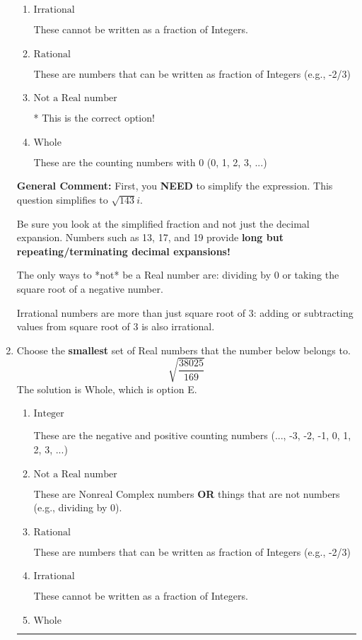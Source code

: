 \documentclass{extbook}[14pt]
\newcommand{\litem}[1]{\item #1

\rule{\textwidth}{0.4pt}}
\begin{document}
\begin{enumerate}
{\begin{enumerate}[label=\Alph*.]
These are the negative and positive counting numbers (..., -3, -2, -1, 0, 1, 2, 3, ...)
\item \( \text{Irrational} \)

These cannot be written as a fraction of Integers.
\item \( \text{Rational} \)

These are numbers that can be written as fraction of Integers (e.g., -2/3)
\item \( \text{Not a Real number} \)

* This is the correct option!
\item \( \text{Whole} \)

These are the counting numbers with 0 (0, 1, 2, 3, ...)
\end{enumerate}

\textbf{General Comment:} First, you \textbf{NEED} to simplify the expression. This question simplifies to $\sqrt{143} i$. 
 
 Be sure you look at the simplified fraction and not just the decimal expansion. Numbers such as 13, 17, and 19 provide \textbf{long but repeating/terminating decimal expansions!} 
 
 The only ways to *not* be a Real number are: dividing by 0 or taking the square root of a negative number. 
 
 Irrational numbers are more than just square root of 3: adding or subtracting values from square root of 3 is also irrational.
}
\litem{
Choose the \textbf{smallest} set of Real numbers that the number below belongs to.
\[ \sqrt{\frac{38025}{169}} \]The solution is \( \text{Whole} \), which is option E.\begin{enumerate}[label=\Alph*.]
\item \( \text{Integer} \)

These are the negative and positive counting numbers (..., -3, -2, -1, 0, 1, 2, 3, ...)
\item \( \text{Not a Real number} \)

These are Nonreal Complex numbers \textbf{OR} things that are not numbers (e.g., dividing by 0).
\item \( \text{Rational} \)

These are numbers that can be written as fraction of Integers (e.g., -2/3)
\item \( \text{Irrational} \)

These cannot be written as a fraction of Integers.
\item \( \text{Whole} \)


\end{enumerate}}
\end{enumerate}
\end{document}
